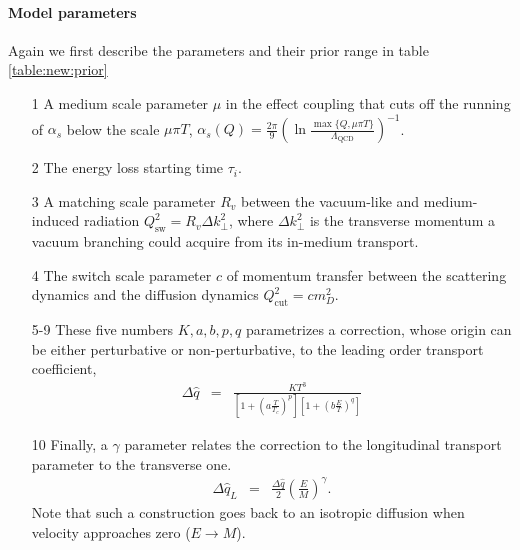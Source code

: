 \paragraph{Model parameters}
Again we first describe the parameters and their prior range in table \ref{table:new:prior}
\begin{itemize}
\item[1] A medium scale parameter $\mu$ in the effect coupling that cuts off the running of $\alpha_s$ below the scale $\mu\pi T$, $\alpha_s(Q) = \frac{2\pi}{9}\left(\ln\frac{\max\{Q, \mu\pi T\}}{\Lambda_{\textrm{QCD}}}\right)^{-1}$.
\item[2] The energy loss starting time $\tau_i$.
\item[3] A matching scale parameter $R_v$ between the vacuum-like and medium-induced radiation $Q_{\textrm{sw}}^2 = R_v\Delta k_\perp^2$, where $\Delta k_\perp^2$ is the transverse momentum a vacuum branching could acquire from its in-medium transport.
\item[4] The switch scale parameter $c$ of momentum transfer between the scattering dynamics and the diffusion dynamics $Q_{\textrm{cut}}^2 = c m_D^2$.
\item[5-9] These five numbers $K,a,b,p,q$ parametrizes a correction, whose origin can be either perturbative or non-perturbative, to the leading order transport coefficient,
\begin{eqnarray}
\Delta\hat{q} &=& \frac{K T^3}{\left[1+\left(a\frac{T}{T_c}\right)^p\right]\left[1+\left(b\frac{E}{T}\right)^q\right]}
\end{eqnarray}
\item[10] Finally, a $\gamma$ parameter relates the correction to the longitudinal transport parameter to the transverse one.
\begin{eqnarray}
\Delta\hat{q}_L &=& \frac{\Delta\hat{q}}{2} \left(\frac{E}{M}\right)^{\gamma}.
\end{eqnarray}
Note that such a construction goes back to an isotropic diffusion when velocity approaches zero ($E\rightarrow M$).
\end{itemize}

